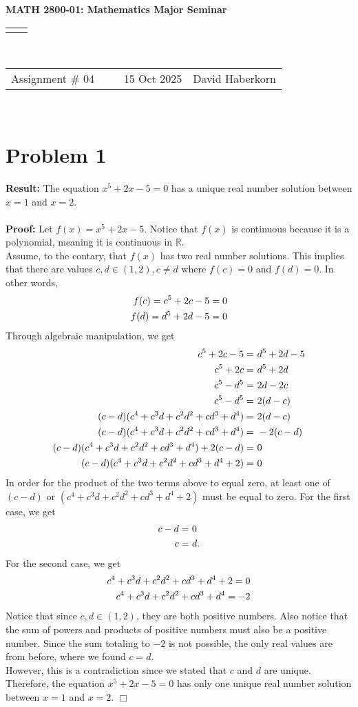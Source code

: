 \documentclass[11pt]{article}
\renewcommand{\title}[1]{\textbf{#1}\\}
\renewcommand{\line}{\begin{tabularx}{\textwidth}{X>{\raggedleft}X}\hline\\\end{tabularx}\\[-0.5cm]}
\newcommand{\leftright}[2]{\begin{tabularx}{\textwidth}{X>{\raggedleft}X}#1%
& #2\\\end{tabularx}\\[-0.5cm]}
\begin{document}
\title{MATH 2800-01: Mathematics Major Seminar}
\line
\leftright{Assignment \# 04 ~~~~ 15 Oct 2025}{David Haberkorn}


\section*{Problem 1}

    \textbf{Result:} The equation $x^5 + 2x - 5 = 0$ has a unique real number solution between $x=1$ and $x=2$.\\
    \\
    \textbf{Proof:} Let $f(x) = x^5 + 2x - 5$. Notice that $f(x)$ is continuous because it is a polynomial, meaning it is continuous in $\mathbb{R}$. \\
    Assume, to the contary, that $f(x)$ has two real number solutions. This implies that there are values $c,d \in (1,2), c \neq d$ where $f(c) = 0$ and $f(d) = 0$. In other words,
    \begin{align}
        f(c) = c^5 + 2c - 5 = 0 \notag \\
        f(d) = d^5 + 2d - 5 = 0 \notag
    \end{align}
    Through algebraic manipulation, we get
    \begin{align}
        c^5 + 2c - 5 =& \ d^5 + 2d - 5 \notag \\
        c^5 + 2c =& \ d^5 + 2d \notag \\
        c^5 - d^5 =& \ 2d - 2c \notag \\
        c^5 - d^5 =& \ 2(d-c) \notag \\
        (c - d)(c^4 + c^3d + c^2d^2 + cd^3 + d^4) =& \ 2(d-c) \notag \\
        (c - d)(c^4 + c^3d + c^2d^2 + cd^3 + d^4) =& \ -2(c-d) \notag \\
        (c - d)(c^4 + c^3d + c^2d^2 + cd^3 + d^4) + 2(c-d)=& \ 0 \notag \\
        (c - d)(c^4 + c^3d + c^2d^2 + cd^3 + d^4 + 2) =& \ 0 \notag
    \end{align}
    In order for the product of the two terms above to equal zero, at least one of $(c-d)$ or $(c^4 + c^3d + c^2d^2 + cd^3 + d^4 + 2)$ must be equal to zero. For the first case, we get
    \begin{align}
        c-d =& \ 0 \notag \\
        c =& \ d . \notag
    \end{align}
    For the second case, we get
    \begin{align}
        c^4 + c^3d + c^2d^2 + cd^3 + d^4 + 2 = 0 \notag \\
        c^4 + c^3d + c^2d^2 + cd^3 + d^4 = -2 \notag
    \end{align}
    Notice that since $c,d \in (1,2)$, they are both positive numbers. Also notice that the sum of powers and products of positive numbers must also be a positive number. Since the sum totaling to $-2$ is not possible, the only real values are from before, where we found $c=d$.\\
    However, this is a contradiction since we stated that $c$ and $d$ are unique. Therefore, the equation $x^5 + 2x - 5 = 0$ has only one unique real number solution between $x=1$ and $x=2$. \hfill $\Box$
\end{document}
